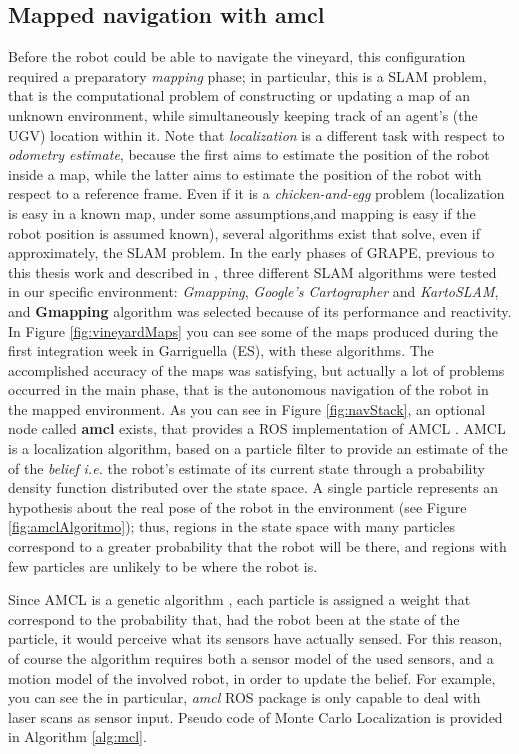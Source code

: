 \subsection{Mapped navigation with amcl}
Before the robot could be able to navigate the vineyard, this configuration required a preparatory \textit{mapping} phase; in particular, this is a \ac{SLAM} problem, that is the computational problem of constructing or updating a map of an unknown environment, while simultaneously keeping track of an agent's (the \ac{UGV}) location within it. Note that \textit{localization} is a different task with respect to \textit{odometry estimate}, because the first aims to estimate the position of the robot inside a map, while the latter aims to estimate the position of the robot with respect to a reference frame. Even if it is a \textit{chicken-and-egg} problem (localization is easy in a known map, under some assumptions,and  mapping is easy if the robot position is assumed known), several algorithms exist that solve, even if approximately, the \ac{SLAM} problem. In the early phases of \ac{GRAPE}, previous to this thesis work and described in \cite{grapeAltroPaper}, three different \ac{SLAM} algorithms were tested in our specific environment: \textit{Gmapping}, \textit{Google's Cartographer} and \textit{KartoSLAM}, and \textbf{Gmapping} algorithm was selected because of its performance and reactivity. In Figure \ref{fig:vineyardMaps} you can see some of the maps produced during the first integration week in Garriguella (ES), with these algorithms. The accomplished accuracy of the maps was satisfying, but actually a lot of problems occurred in the main phase, that is the autonomous navigation of the robot in the mapped environment. As you can see in Figure \ref{fig:navStack}, an optional node called \textbf{amcl} exists, that provides a \ac{ROS} implementation of \ac{AMCL} \parencite{amcl}. \ac{AMCL} is a localization algorithm, based on a particle filter to provide an estimate of the of the \textit{belief} \textit{i.e.} the robot's estimate of its current state through a probability density function distributed over the state space. A single particle represents an hypothesis about the real pose of the robot in the environment (see Figure \ref{fig:amclAlgoritmo}); thus, regions in the state space with many particles correspond to a greater probability that the robot will be there, and regions with few particles are unlikely to be where the robot is.

Since \ac{AMCL} is a genetic algorithm \parencite{geneticAlgorithm}, each particle is assigned a weight that correspond to the probability that, had the robot been at the state of the particle, it would perceive what its sensors have actually sensed. For this reason, of course the algorithm requires both a sensor model of the used sensors, and a motion model of the involved robot, in order to update the belief. For example, you can see the 
in particular, \textit{amcl} \ac{ROS} package is only capable to deal with laser scans as sensor input. Pseudo code of Monte Carlo Localization is provided in Algorithm \ref{alg:mcl}.

